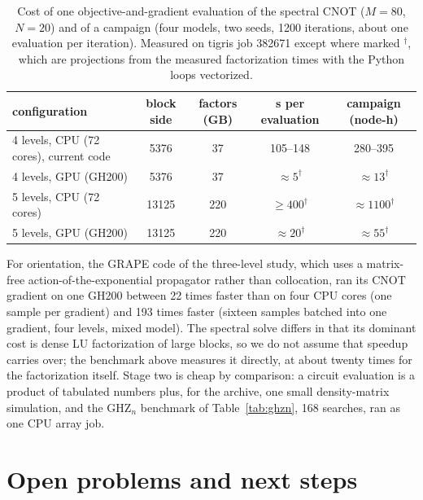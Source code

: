 \documentclass[10pt]{article}
\begin{document}
\begin{table}[htbp]
\centering
\caption{Cost of one objective-and-gradient evaluation of the spectral CNOT
($M = 80$, $N = 20$) and of a campaign (four models, two seeds, 1200
iterations, about one evaluation per iteration). Measured on tigris job 382671
except where marked $^\dagger$, which are projections from the measured
factorization times with the Python loops vectorized.}
\label{tab:compute}
\small
\begin{tabular}{lcccc}
\toprule
configuration & block side & factors (GB) & s per evaluation & campaign (node-h) \\
\midrule
4 levels, CPU (72 cores), current code & 5376  & 37  & 105--148 & 280--395 \\
4 levels, GPU (GH200)                  & 5376  & 37  & $\approx 5^\dagger$ & $\approx 13^\dagger$ \\
5 levels, CPU (72 cores)               & 13125 & 220 & $\geq 400^\dagger$ & $\approx 1100^\dagger$ \\
5 levels, GPU (GH200)                  & 13125 & 220 & $\approx 20^\dagger$ & $\approx 55^\dagger$ \\
\bottomrule
\end{tabular}
\end{table}

For orientation, the GRAPE code of the three-level study, which uses a
matrix-free action-of-the-exponential propagator rather than collocation, ran
its CNOT gradient on one GH200 between 22 times faster than on four CPU cores
(one sample per gradient) and 193 times faster (sixteen samples batched into
one gradient, four levels, mixed model). The spectral solve differs in that its dominant cost is dense LU
factorization of large blocks, so we do not assume that speedup carries over;
the benchmark above measures it directly, at about twenty times for the factorization itself. Stage two is cheap by comparison: a circuit
evaluation is a product of tabulated numbers plus, for the archive, one small
density-matrix simulation, and the GHZ$_n$ benchmark of
Table~\ref{tab:ghzn}, 168 searches, ran as one CPU array job.

\section{Open problems and next steps}
\label{sec:open}
\end{document}
